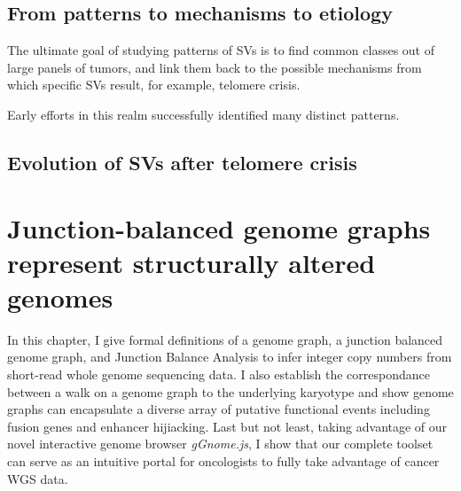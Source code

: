 \documentclass[phd,tocprelim]{cornell}
\begin{document}
\section{From patterns to mechanisms to etiology}
The ultimate goal of studying patterns of SVs is to find common classes out of large panels of tumors, and link them back to the possible mechanisms from which specific SVs result, for example, telomere crisis.

Early efforts in this realm successfully identified many distinct patterns.

\section{Evolution of SVs after telomere crisis}

\chapter{Junction-balanced genome graphs represent structurally altered genomes}
In this chapter, I give formal definitions of a genome graph, a junction balanced genome graph, and Junction Balance Analysis to infer integer copy numbers from short-read whole genome sequencing data. I also establish the correspondance between a walk on a genome graph to the underlying karyotype and show genome graphs can encapsulate a diverse array of putative functional events including fusion genes and enhancer hijiacking. Last but not least, taking advantage of our novel interactive genome browser \textit{gGnome.js}, I show that our complete toolset can serve as an intuitive portal for oncologists to fully take advantage of cancer WGS data.
\end{document}
